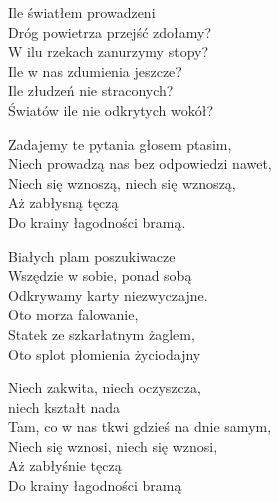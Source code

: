 
\begin{text}
    Ile światłem prowadzeni\\
    Dróg powietrza przejść zdołamy?\\
    W ilu rzekach zanurzymy stopy?\\
    Ile w nas zdumienia jeszcze?\\
    Ile złudzeń nie straconych?\\
    Światów ile nie odkrytych wokół?

    Zadajemy te pytania głosem ptasim,\\
    Niech prowadzą nas bez odpowiedzi nawet,\\
    Niech się wznoszą, niech się wznoszą,\\
    Aż zabłysną tęczą\\
    Do krainy łagodności bramą.

    Białych plam poszukiwacze\\
    Wszędzie w sobie, ponad sobą\\
    Odkrywamy karty niezwyczajne.\\
    Oto morza falowanie,\\
    Statek ze szkarłatnym żaglem,\\
    Oto splot płomienia życiodajny

    Niech zakwita, niech oczyszcza,\\
    niech kształt nada\\
    Tam, co w nas tkwi gdzieś na dnie samym,\\
    Niech się wznosi, niech się wznosi,\\
    Aż zabłyśnie tęczą\\
    Do krainy łagodności bramą
\end{text}
\begin{chord}

\end{chord}